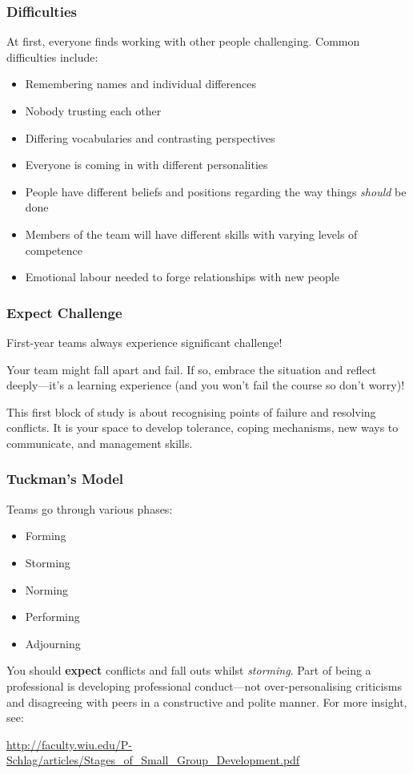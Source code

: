 \begin{frame}
	\frametitle{Difficulties}
	
	At first, everyone finds working with other people challenging. Common difficulties include:
	
	\begin{itemize}
		\item Remembering names and individual differences
		\item Nobody trusting each other
		\item Differing vocabularies and contrasting perspectives
		\item Everyone is coming in with different personalities
		\item People have different beliefs and positions regarding the way things \textit{should} be done
		\item Members of the team will have different skills with varying levels of competence
		\item Emotional labour needed to forge relationships with new people 
	\end{itemize}
\end{frame}

\begin{frame}
	\frametitle{Expect Challenge}
	
	First-year teams always experience significant challenge! 
	
	\vspace{2em}
	
	Your team might fall apart and fail. If so, embrace the situation and reflect deeply---it's a learning experience (and you won't fail the course so don't worry)!
	
	\vspace{2em}
	
	This first block of study is about recognising points of failure and resolving conflicts. 
	It is your space to develop tolerance, coping mechanisms, new ways to communicate, and management skills.
\end{frame}

\begin{frame}
	\frametitle{Tuckman's Model}
	
	Teams go through various phases:
	
	\begin{itemize}
		\item Forming
		\item Storming
		\item Norming
		\item Performing
		\item Adjourning
	\end{itemize}
	
	You should \textbf{expect} conflicts and fall outs whilst \textit{storming}. Part of being a professional is developing professional conduct---not over-personalising criticisms and disagreeing with peers in a constructive and polite manner. For more insight, see: 
	
	\vspace{1em}	
	
	\url{http://faculty.wiu.edu/P-Schlag/articles/Stages_of_Small_Group_Development.pdf}
	
\end{frame}

